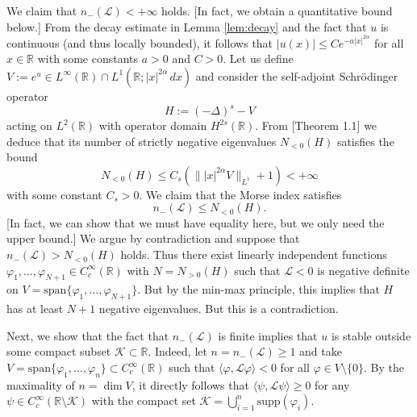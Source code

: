 \documentclass[reqno,10pt,a4paper]{amsart}
\theoremstyle{definition}
\theoremstyle{definition}
\theoremstyle{remark}
\theoremstyle{remark}
\numberwithin{equation}{section}
\newcommand{\R}{\mathbb{R}}
\newcommand{\KK}{\mathcal{K}}
\newcommand{\Ds}{(-\Delta)^{s}}
\newcommand{\CC}{C}
\renewcommand{\phi}{\varphi}
\newcommand{\LL}{\mathcal{L}}
\begin{document}
We claim that $n_-(\LL) < +\infty$ holds. [In fact, we obtain a quantitative bound below.] From the decay estimate in Lemma \ref{lem:decay} and the fact that $u$ is continuous (and thus locally bounded), it follows that $|u(x)| \leq C e^{-a|x|^{2 \alpha}}$ for all $x \in \R$ with some constants $a> 0$ and $C > 0$. Let us define $V := e^{u} \in L^\infty(\R) \cap L^1(\R; |x|^{2 \alpha} \, dx)$ and consider the self-adjoint Schr\"odinger operator
$$
H := \Ds - V    
$$
acting on $L^2(\R)$ with operator domain $H^{2s}(\R)$. From \cite{BrFaGr-24}[Theorem 1.1] we deduce that its number of strictly negative eigenvalues $N_{<0}(H)$ satisfies the bound
$$
N_{<0}(H) \leq C_s ( \| |x|^{2 \alpha} V \|_{L^1} + 1) < +\infty
$$
with some constant $C_s > 0$. We claim that the Morse index satisfies 
$$n_-(\LL) \leq N_{<0}(H).$$
[In fact, we can show that we must have equality here, but we only need the upper bound.] We argue by contradiction and suppose that $n_-(\LL) >N_{<0}(H)$ holds. Thus there exist linearly independent functions $\phi_1, \ldots, \phi_{N+1} \in C^\infty_c(\R)$ with  $N = N_{>0}(H)$ such that $\LL < 0$ is negative definite on $V = \mathrm{span} \{ \phi_1, \ldots, \phi_{N+1} \}$. But by the min-max principle, this implies that $H$ has at least $N+1$ negative eigenvalues. But this is a contradiction.

Next, we show that the fact that $n_-(\LL)$ is finite implies that $u$ is stable outside some compact subset $\KK \subset \R$.  Indeed, let $n= n_-(\LL) \geq 1$  and take $V = \mathrm{span} \{ \phi_1, \ldots, \phi_n \} \subset \CC^\infty_c(\R)$ such that $\langle \phi, \LL \phi \rangle < 0$ for all $\phi \in V \setminus \{ 0 \}$. By the maximality of $n=\dim V$, it directly follows that $\langle \psi, \LL \psi \rangle \geq 0$ for any $\psi \in \CC^\infty_c(\R \setminus \KK)$ with the compact set $\KK = \bigcup_{i=1}^n \mathrm{supp}(\phi_i)$.
\end{document}

